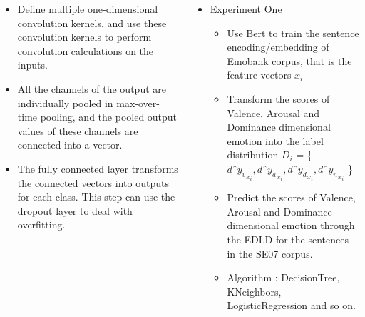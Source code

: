 \documentclass{tikzposter} %
\begin{document}
\begin{columns}
{\begin{itemize}
	\item 
	Define multiple one-dimensional convolution kernels, 
	and use these convolution kernels to 
	perform convolution calculations on the inputs. 
	\item 
	All the channels of the output are individually pooled 
	in max-over-time pooling, 
	and the pooled output values of 
	these channels are connected into a vector.
	\item 
	The fully connected layer transforms 
	the connected vectors into outputs for each class. 
	This step can use the dropout layer to deal with overfitting.
\end{itemize}
}

{
\begin{itemize}
	\item 
	Experiment One
	\begin{itemize}
		\item 
		Use Bert to train the sentence encoding/embedding
		of Emobank corpus, that is the feature vectors $ x_{i} $
		\item 
		Transform the scores of Valence, Arousal and Dominance 
		dimensional emotion into 
		the label distribution 
		$ D_{i} $ = \{ 
		$ d ˆ {y_{v}} _{ x_{i} } , 
		d ˆ {y_{a}} _{ x_{i} } ,
		d ˆ {y_{d}} _{ x_{i} } ,
		d ˆ {y_{n}} _{ x_{i} }  $ \}
		\item 
		Predict the scores of 
		Valence, Arousal and Dominance dimensional emotion
		through the EDLD
		for the sentences in the SE07 corpus.
		\item 
		Algorithm : DecisionTree, KNeighbors, LogisticRegression and so on.
	\end{itemize}
	

\end{itemize}}
\end{columns}
\end{document}
